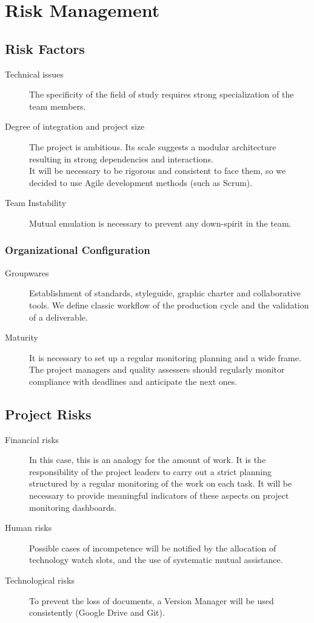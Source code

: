 \documentclass{article}%
\begin{document}
\section{Risk Management}
\subsection{Risk Factors}

\begin{description}
\item[Technical issues] The specificity of the field of study requires
strong specialization of the team members.
\item [Degree of integration and project size] The project is ambitious.
Its scale suggests a modular architecture
resulting in strong dependencies and interactions. \\
It will be necessary to be rigorous and consistent to face them, 
so we decided to use Agile development methods (such as Scrum).
\item [Team Instability] Mutual emulation is necessary to
prevent any down-spirit in the team.
\end {description}

\subsubsection {Organizational Configuration}

\begin {description}
\item [Groupwares] Establishment of standards, styleguide,
graphic charter and collaborative tools. We define classic
workflow of the production cycle and the validation of a deliverable.
\item [Maturity] It is necessary to set up a regular monitoring
planning and a wide frame. The project managers and
quality assessers should regularly monitor compliance with
deadlines and anticipate the next ones.
\end {description}

\subsection {Project Risks}

\begin {description}
\item [Financial risks] In this case, this is an analogy for
the amount of work. It is the responsibility of the
project leaders to carry out a strict planning structured by a
regular monitoring of the work on each task. It will be necessary
to provide meaningful indicators of these aspects on
project monitoring dashboards.
\item [Human risks] Possible cases of incompetence will be notified by
the allocation of technology watch slots, and the use of
systematic mutual assistance.
\item [Technological risks] To prevent the loss of documents, a
Version Manager will be used consistently (Google Drive and Git).
\end {description}
\end{document}
